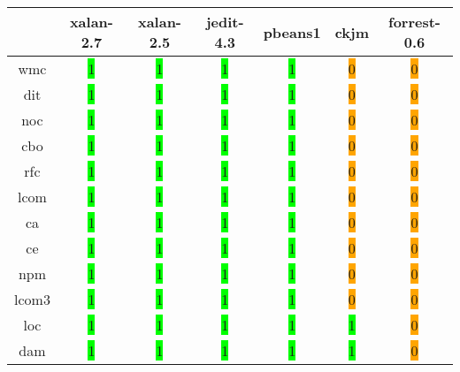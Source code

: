 \begin{table}[H]
\centering
    \begin{tabular}{|c|c|c|c|c|c|c|}
        \hline
         & xalan-2.7 & xalan-2.5 & jedit-4.3 & pbeans1 & ckjm & forrest-0.6 \\ \hline
        \acrshort{wmc} & \colorbox{lime}{1} & \colorbox{lime}{1} & \colorbox{lime}{1} & \colorbox{lime}{1} & \colorbox{orange}{0} & \colorbox{orange}{0} \\ \hline
        \acrshort{dit} & \colorbox{lime}{1} & \colorbox{lime}{1} & \colorbox{lime}{1} & \colorbox{lime}{1} & \colorbox{orange}{0} & \colorbox{orange}{0} \\ \hline
        \acrshort{noc} & \colorbox{lime}{1} & \colorbox{lime}{1} & \colorbox{lime}{1} & \colorbox{lime}{1} & \colorbox{orange}{0} & \colorbox{orange}{0} \\ \hline
        \acrshort{cbo} & \colorbox{lime}{1} & \colorbox{lime}{1} & \colorbox{lime}{1} & \colorbox{lime}{1} & \colorbox{orange}{0} & \colorbox{orange}{0} \\ \hline
        \acrshort{rfc} & \colorbox{lime}{1} & \colorbox{lime}{1} & \colorbox{lime}{1} & \colorbox{lime}{1} & \colorbox{orange}{0} & \colorbox{orange}{0} \\ \hline
        \acrshort{lcom} & \colorbox{lime}{1} & \colorbox{lime}{1} & \colorbox{lime}{1} & \colorbox{lime}{1} & \colorbox{orange}{0} & \colorbox{orange}{0} \\ \hline
        \acrshort{ca} & \colorbox{lime}{1} & \colorbox{lime}{1} & \colorbox{lime}{1} & \colorbox{lime}{1} & \colorbox{orange}{0} & \colorbox{orange}{0} \\ \hline
        \acrshort{ce} & \colorbox{lime}{1} & \colorbox{lime}{1} & \colorbox{lime}{1} & \colorbox{lime}{1} & \colorbox{orange}{0} & \colorbox{orange}{0} \\ \hline
        \acrshort{npm} & \colorbox{lime}{1} & \colorbox{lime}{1} & \colorbox{lime}{1} & \colorbox{lime}{1} & \colorbox{orange}{0} & \colorbox{orange}{0} \\ \hline
        \acrshort{lcom3} & \colorbox{lime}{1} & \colorbox{lime}{1} & \colorbox{lime}{1} & \colorbox{lime}{1} & \colorbox{orange}{0} & \colorbox{orange}{0} \\ \hline
        \acrshort{loc} & \colorbox{lime}{1} & \colorbox{lime}{1} & \colorbox{lime}{1} & \colorbox{lime}{1} & \colorbox{lime}{1} & \colorbox{orange}{0} \\ \hline
        \acrshort{dam} & \colorbox{lime}{1} & \colorbox{lime}{1} & \colorbox{lime}{1} & \colorbox{lime}{1} & \colorbox{lime}{1} & \colorbox{orange}{0} \\ \hline

\end{tabular}
\end{table}
